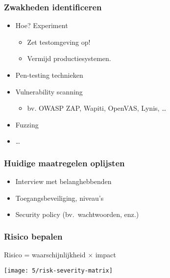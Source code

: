 \documentclass[aspectratio=169]{beamer}
\begin{document}
\begin{frame}
  \frametitle{Zwakheden identificeren}

  \begin{itemize}
    \item Hoe? Experiment
          \begin{itemize}
            \item Zet testomgeving op!
            \item Vermijd productiesystemen.
          \end{itemize}
    \item Pen-testing technieken
    \item Vulnerability scanning
          \begin{itemize}
            \item bv. OWASP ZAP, Wapiti, OpenVAS, Lynis, \ldots
          \end{itemize}
    \item Fuzzing
    \item \ldots
  \end{itemize}

\end{frame}

\begin{frame}
  \frametitle{Huidige maatregelen oplijsten}

  \begin{itemize}
    \item Interview met belanghebbenden
    \item Toegangsbeveiliging, niveau's
    \item Security policy (bv.\ wachtwoorden, enz.)
  \end{itemize}

\end{frame}

\begin{frame}
  \frametitle{Risico bepalen}

  \centering

  Risico = waarschijnlijkheid $\times$ impact

  \texttt{[image: 5/risk-severity-matrix]}

\end{frame}
\end{document}
